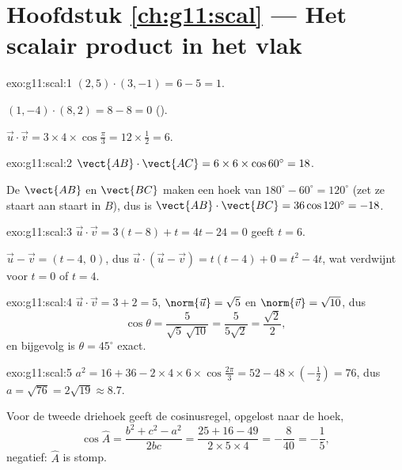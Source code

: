 \section*{Hoofdstuk \ref{ch:g11:scal} --- Het scalair product in het vlak}

\begin{solution}{exo:g11:scal:1}
$(2,5)\cdot(3,-1) = 6 - 5 = 1$.

$(1,-4)\cdot(8,2) = 8 - 8 = 0$ ().

$\vec u\cdot\vec v = 3 \times 4 \times \cos\frac\pi3 = 12 \times \frac12
= 6$.
\end{solution}

\begin{solution}{exo:g11:scal:2}
$\vect{AB}\cdot\vect{AC} = 6 \times 6 \times \cos 60^\circ = 18$.

De  $\vect{AB}$ en $\vect{BC}$ maken een hoek van
$180^\circ - 60^\circ = 120^\circ$ (zet ze staart aan staart in $B$), dus is
$\vect{AB}\cdot\vect{BC} = 36 \cos 120^\circ = -18$.
\end{solution}

\begin{solution}{exo:g11:scal:3}
$\vec u \cdot \vec v = 3(t - 8) + t = 4t - 24 = 0$ geeft $t = 6$.

$\vec u - \vec v = (t - 4,\ 0)$, dus
$\vec u \cdot (\vec u - \vec v) = t(t-4) + 0 = t^2 - 4t$, wat verdwijnt voor
$t = 0$ of $t = 4$.
\end{solution}

\begin{solution}{exo:g11:scal:4}
$\vec u \cdot \vec v = 3 + 2 = 5$, $\norm{\vec u} = \sqrt5$ en
$\norm{\vec v} = \sqrt{10}$, dus
\[
\cos\theta = \frac{5}{\sqrt5\,\sqrt{10}} = \frac{5}{5\sqrt2}
= \frac{\sqrt2}{2},
\]
en bijgevolg is $\theta = 45^\circ$ exact.
\end{solution}

\begin{solution}{exo:g11:scal:5}
$a^2 = 16 + 36 - 2 \times 4 \times 6 \times \cos\frac{2\pi}{3}
= 52 - 48 \times \left(-\frac12\right) = 76$, dus
$a = \sqrt{76} = 2\sqrt{19} \approx 8.7$.

Voor de tweede driehoek geeft de cosinusregel, opgelost naar de hoek,
\[
\cos\widehat A = \frac{b^2 + c^2 - a^2}{2bc}
= \frac{25 + 16 - 49}{2 \times 5 \times 4} = -\frac{8}{40} = -\frac15,
\]
negatief: $\widehat A$ is stomp.
\end{solution}

